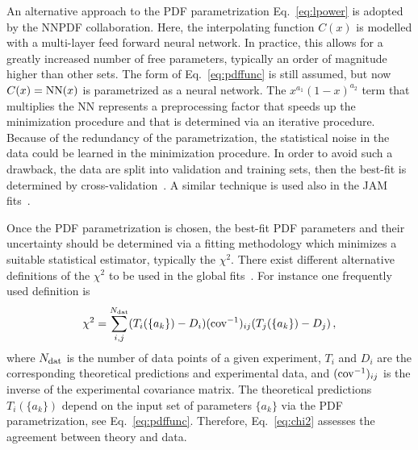 An alternative approach to the PDF parametrization Eq.~\eqref{eq:lpower}
is adopted by the NNPDF collaboration. 
%
Here, the interpolating function $C(x)$ is modelled with 
a multi-layer feed forward neural network.
%
In practice, this allows for a greatly increased number of free parameters, 
typically an order of magnitude higher than other sets.
%
The form of Eq.~\eqref{eq:pdffunc} is still assumed, but
now $C(x)={\rm NN}(x)$ is parametrized as a neural network.
%
The $x^{a_1}(1-x)^{a_2}$ term that multiplies the NN represents
a preprocessing factor that speeds up the minimization procedure
and that is determined via an iterative procedure.
%
Because of the redundancy of the parametrization, the statistical noise in 
the data could be learned in the minimization procedure.
%
In order to avoid such a drawback, the data are split into validation and 
training sets, then the best-fit is determined by
cross-validation~\cite{Forte:2002fg,DelDebbio:2004xtd}.
%
A similar technique is used also in the JAM 
fits~\cite{Sato:2016tuz,Ethier:2017zbq}.

Once the PDF parametrization is chosen, the best-fit PDF parameters
and their uncertainty should be determined via a fitting methodology
which minimizes a suitable statistical estimator, typically the $\chi^2$.
%
There exist different alternative definitions of the $\chi^2$
to be used in the global fits~\cite{Ball:2012wy}. 
%
For instance one frequently used definition is
\begin{equation}
\chi^2 
= 
\sum_{i,j}^{N_{\rm dat}} (T_i(\{a_k\}) - D_i) 
({\rm cov^{-1}})_{ij} (T_j(\{a_k\}) - D_j)\,,
\label{eq:chi2}
\end{equation}
where $N_{\rm dat}$ is the number of data points of a given experiment,
$T_i$ and $D_i$ are the corresponding theoretical predictions
and experimental data, and $({\rm cov^{-1}})_{ij}$ is the inverse of the 
experimental covariance matrix.
%
The theoretical predictions $T_i(\{a_k\})$ depend on the input set of 
parameters $\{a_k\}$ via the PDF parametrization, see Eq.~\eqref{eq:pdffunc}.
%
Therefore, Eq.~\eqref{eq:chi2} assesses the agreement between theory and data.

